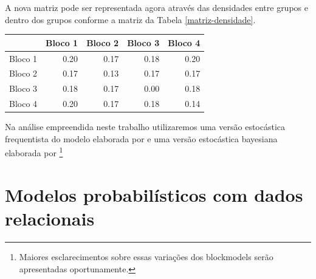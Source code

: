 \documentclass[a4paper, 12pt, openright, oneside, german, french, english, brazil]{abntex2}
\begin{document}
	A nova matriz pode ser representada agora através das densidades entre grupos e dentro dos grupos conforme a matriz da Tabela \ref{matriz-densidade}.
	
	\begin{table}[ht]
		{\begin{tabular}{rrrrr}
			\hline
			& Bloco 1 & Bloco 2 & Bloco 3 & Bloco 4 \\ 
			\hline
			Bloco 1 & 0.20 & 0.17 & 0.18 & 0.20 \\ 
			Bloco 2 & 0.17 & 0.13 & 0.17 & 0.17 \\ 
			Bloco 3 & 0.18 & 0.17 & 0.00 & 0.18 \\ 
			Bloco 4 & 0.20 & 0.17 & 0.18 & 0.14 \\ 
			\hline
		\end{tabular}
	}
	{ }
	\end{table}


	
	
	
	Na análise empreendida neste trabalho utilizaremos uma versão estocástica frequentista do modelo elaborada por  e uma versão estocástica bayesiana elaborada por \footnote{Maiores esclarecimentos sobre essas variações dos blockmodels serão apresentadas oportunamente.}
	
	
	
	
	\section{Modelos probabilísticos com dados relacionais}
	
\end{document}
